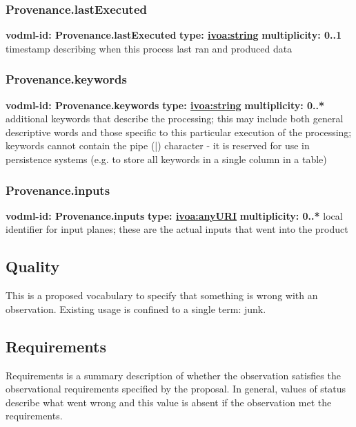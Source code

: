    \subsubsection{Provenance.lastExecuted}
      \textbf{vodml-id: Provenance.lastExecuted} \newline
      \textbf{type: \hyperref[sect:ivoa]{ivoa:string}} \newline
      \textbf{multiplicity: 0..1} \newline
      timestamp describing when this process last ran and produced data

    \subsubsection{Provenance.keywords}
      \textbf{vodml-id: Provenance.keywords} \newline
      \textbf{type: \hyperref[sect:ivoa]{ivoa:string}} \newline
      \textbf{multiplicity: 0..*} \newline
      additional keywords that describe the processing; this may include both general descriptive words and those specific to this particular execution of the processing; keywords cannot contain the pipe (|) character - it is reserved for use in persistence systems (e.g. to store all keywords in a single column in a table)

    \subsubsection{Provenance.inputs}
      \textbf{vodml-id: Provenance.inputs} \newline
      \textbf{type: \hyperref[sect:ivoa]{ivoa:anyURI}} \newline
      \textbf{multiplicity: 0..*} \newline
      local identifier for input planes; these are the actual inputs that went into the product

  \subsection{Quality}
  \label{sect:Quality}
    This is a proposed vocabulary to specify that something is wrong with an observation. Existing usage is confined to a single term: junk.

  \subsection{Requirements}
  \label{sect:Requirements}
    Requirements is a summary description of whether the observation satisfies the observational requirements specified by the proposal. In general, values of status describe what went wrong and this value is absent if the observation met the requirements.

